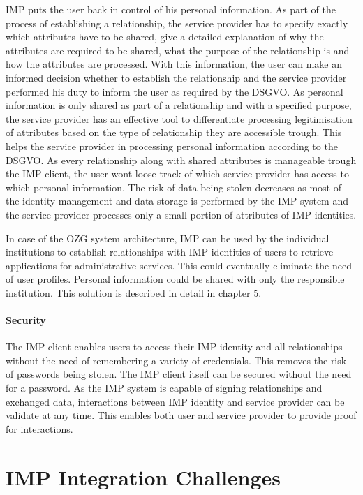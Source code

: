 IMP puts the user back in control of his personal information. As part of the process of establishing a relationship, the service provider has to specify exactly which attributes have to be shared, give a detailed explanation of why the attributes are required to be shared, what the purpose of the relationship is and how the attributes are processed. With this information, the user can make an informed decision whether to establish the relationship and the service provider performed his duty to inform the user as required by the DSGVO. As personal information is only shared as part of a relationship and with a specified purpose, the service provider has an effective tool to differentiate processing legitimisation of attributes based on the type of relationship they are accessible trough. This helps the service provider in processing personal information according to the DSGVO. As every relationship along with shared attributes is manageable trough the IMP client, the user wont loose track of which service provider has access to which personal information. The risk of data being stolen decreases as most of the identity management and data storage is performed by the IMP system and the service provider processes only a small portion of attributes of IMP identities.

In case of the OZG system architecture, IMP can be used by the individual institutions to establish relationships with IMP identities of users to retrieve applications for administrative services. This could eventually eliminate the need of user profiles. Personal information could be shared with only the responsible institution. This solution is described in detail in chapter 5.

\paragraph{Security}

The IMP client enables users to access their IMP identity and all relationships without the need of remembering a variety of credentials. This removes the risk of passwords being stolen. The IMP client itself can be secured without the need for a password. As the IMP system is capable of signing relationships and exchanged data, interactions between IMP identity and service provider can be validate at any time. This enables both user and service provider to provide proof for interactions.

\section{IMP Integration Challenges}

